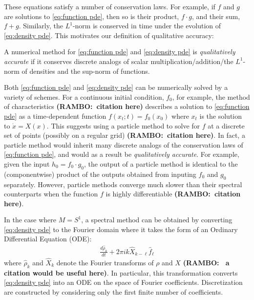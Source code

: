 \documentclass[final,leqno]{siamltex1213}
\newcommand{\ram}[1]{{\normalsize{\textbf{({\color{red}RAMBO:\ }#1)}}}}
\begin{document}
These equations satisfy a number of conservation laws.
For example, if $f$ and $g$ are solutions to \eqref{eq:function pde},
then so is their product, $f \cdot g$, and their sum, $f+g$.
Similarly, the $L^{1}$-norm is conserved in time under the evolution of \eqref{eq:density pde}.
This motivates our definition of qualitative accuracy:

\begin{definition} \label{def:quality}
	    A numerical method for \eqref{eq:function pde} and \eqref{eq:density pde} is \emph{qualitatively accurate} if it conserves discrete analogs of scalar multiplication/addition/the $L^{1}$-norm of densities and the sup-norm of functions.
\end{definition}

Both \eqref{eq:function pde} and \eqref{eq:density pde} can be numerically solved by a variety of schemes.
For a continuous initial condition, $f_0$, for example, the method of characteristics \ram{citation here} describes a solution to \eqref{eq:function pde} as a time-dependent function $f( x_{t} ;t) = f_{0}( x_{0} )$ where $x_{t}$ is the solution to $\dot{x} = X(x)$.
This suggests using a particle method to solve for $f$ at a discrete set of points (possibly on a regular grid) \ram{citation here}.
 In fact, a particle method would inherit many discrete analogs of the conservation laws of \eqref{eq:function pde}, and would as a result be \emph{qualitatively accurate}.
For example, given the input $h_{0} = f_{0} \cdot g_{0}$, the output of a particle method is identical to the (componentwise) product of the outputs obtained from inputing $f_{0}$ and $g_{0}$ separately.
However, particle methods converge much slower than their spectral counterparts when the function $f$ is highly differentiable \ram{citation here}.

In the case where $M=S^{1}$, a spectral method can be obtained by converting \eqref{eq:density pde} to the Fourier domain where it takes the form
of an Ordinary Differential Equation (ODE):
\begin{align}
	\frac{d \hat{\rho}_{k}}{dt} + 2\pi i k  \widehat{X}_{k-\ell} \hat{f}_{\ell} \label{eq:standard spectral}
\end{align}
where $\hat{\rho}_{k}$ and $\widehat{X}_{k}$ denote the Fourier transforms of $\rho$ and $X$ \ram{ a citation would be useful here}.
In particular, this transformation converts \eqref{eq:density pde} into an ODE on the space of Fourier coefficients.
Discretization are constructed by considering only the first finite number of coefficients. 
\end{document}
